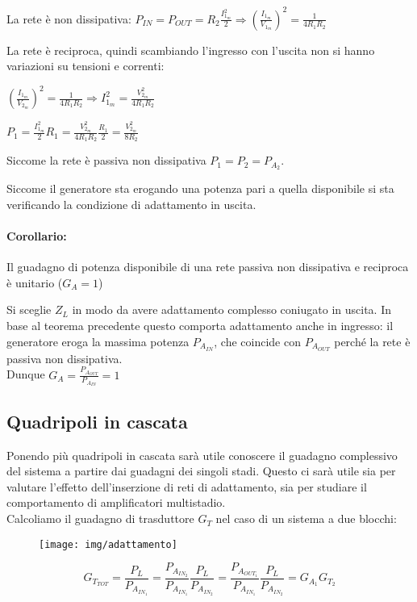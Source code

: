 La rete è non dissipativa:
$P_{IN} = P_{OUT} = R_2 \frac{I_{1_m}^2}{2}
\Rightarrow \left( \frac{I_{1_m}}{V_{1_m}} \right) ^2 = \frac{1}{4 R_1 R_2}$

La rete è reciproca, quindi scambiando l'ingresso con l'uscita non si hanno variazioni su tensioni e correnti:

$\left( \frac{I_{1_m}}{V_{2_m}} \right) ^2 = \frac{1}{4 R_1 R_2} \Rightarrow
I_{1_m}^2 = \frac{V_{2_m}^2}{4 R_1 R_2}$

$P_1 = \frac{I_{1_m}^2}{2} R_1 = \frac{V_{2_m}^2}{4 R_1 R_2} \frac{R_1}{2} = \frac{V_{2_m}^2}{8R_2}$

Siccome la rete è passiva non dissipativa $P_1 = P_2 = P_{A_2}$.

Siccome il generatore sta erogando una potenza pari a quella disponibile si sta verificando la condizione di adattamento in uscita.

\paragraph{Corollario:} Il guadagno di potenza disponibile di una rete passiva non dissipativa e reciproca è unitario ($G_A = 1$)

Si sceglie $Z_L$ in modo da avere adattamento complesso coniugato in uscita. In base al teorema precedente questo comporta adattamento anche in ingresso: il generatore eroga la massima potenza $P_{A_{IN}}$, che coincide con $P_{A_{OUT}}$ perché la rete è passiva non dissipativa.\\
Dunque $G_A = \frac{P_{A_{OUT}}}{P_{A_{IN}}} = 1$

\subsection{Quadripoli in cascata}
Ponendo più quadripoli in cascata sarà utile conoscere il guadagno complessivo del sistema a partire dai guadagni dei singoli stadi. Questo ci sarà utile sia per valutare l'effetto dell'inserzione di reti di adattamento, sia per studiare il comportamento di amplificatori multistadio.
\\
Calcoliamo il guadagno di trasduttore $G_T$ nel caso di un sistema a due blocchi:

\begin{figure}[hbt]
	\centering
	\texttt{[image: img/adattamento]}
	\caption{}
	\label{fig:adatttamento}
\end{figure}


\[
G_{T_{TOT}} = \frac{P_L}{P_{A_{IN_1}}}=
\frac{P_{A_{IN_2}}}{P_{A_{IN_1}}}
\frac{P_L}{P_{A_{IN_2}}} =
\frac{P_{A_{OUT_1}}}{P_{A_{IN_1}}}
\frac{P_L}{P_{A_{IN_2}}}
=
G_{A_1} G_{T_2}
\]

